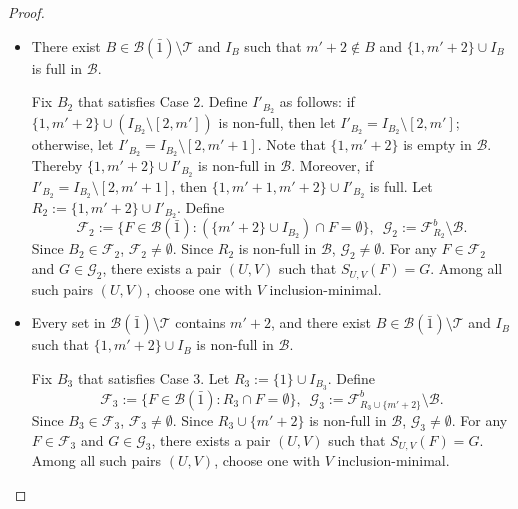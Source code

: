 \documentclass[11pt]{article}
\newcommand{\m}{\mathcal}
\begin{document}
\begin{proof}
\begin{itemize}
Fix $B_1$ that satisfies Case 1. 
Let $R_1:=\{1,m'+2\}\cup I_{B_1}$.
Define 
\begin{equation*}
    \m F_1:=\{F\in \m B(\bar1): R_1\cap F=\emptyset\}, \,\,\,
    \m G_1:=\m F_{R_1}^b\setminus \m B.
\end{equation*}
Since $B_1\in \m F_1$, $\m F_1\ne \emptyset$.
Since $R_1$ is non-full in $\m B$, $\m G_1\ne \emptyset$. 
For any $F\in \m F_1$ and $G\in \m G_1$, there exists a pair $(U,V)$ such that $S_{U,V}(F)=G$. Among all such pairs $(U,V)$, choose one with $V$ inclusion-minimal. 


\item[Case 2.] 
There exist $B\in \m B(\bar{1})\setminus \m T$ and $I_B$ such that $m'+2\not\in B $ and $\{1,m'+2\}\cup I_B$ is full in $\m B$. 

Fix $B_2$ that satisfies Case 2.
Define $I'_{B_2}$ as follows: 
if $\{1,m'+2\}\cup (I_{B_2}\setminus [2,m'])$ is non-full, then 
let $I'_{B_2}=I_{B_2}\setminus [2,m']$; otherwise, let $I'_{B_2}=I_{B_2}\setminus [2,m'+1]$. 
Note that $\{1,m'+2\}$ is empty in $\m B$. Thereby $\{1,m'+2\}\cup I'_{B_2}$ is non-full in $\m B$. Moreover, if $I'_{B_2}=I_{B_2}\setminus [2,m'+1]$, then $\{1,m'+1,m'+2\}\cup I'_{B_2}$ is full. 
Let $R_2:=\{1, m'+2\}\cup I'_{B_2}$.
Define 
\begin{equation*}
    \m F_2:=\{F\in \m B(\bar1): (\{m'+2\}\cup I_{B_2})\cap F=\emptyset\}, \,\,\,
    \m G_2:=\m F_{R_2}^b\setminus \m B.
\end{equation*}
Since $B_2\in \m F_2$, $\m F_2\ne \emptyset$. Since $R_2$ is non-full in $\m B$, $\m G_2\ne \emptyset$. 
For any $F\in \m F_2$ and $G\in \m G_2$, there exists a pair $(U,V)$ such that $S_{U,V}(F)=G$. Among all such pairs $(U,V)$, choose one with $V$ inclusion-minimal. 



\item[Case 3.] Every set in $\m B(\bar{1})\setminus \m T$ contains $m'+2$, and there exist $B\in \m B(\bar{1})\setminus \m T$ and $I_B$ such that $\{1,m'+2\}\cup I_B$ is non-full in $\m B$.

Fix $B_3$ that satisfies Case 3. 
Let $R_3:=\{1\}\cup I_{B_3}$.
Define
\begin{equation*}
    \m F_3:=\{F\in \m B(\bar1): R_3\cap F=\emptyset\}, \,\,\,
    \m G_3:=\m F_{R_3\cup \{m'+2\}}^b\setminus \m B.
\end{equation*}
Since $B_3\in \m F_3$, $\m F_3\ne \emptyset$.
Since $R_3\cup \{m'+2\}$ is non-full in $\m B$, $\m G_3\ne \emptyset$. 
For any $F\in \m F_3$ and $G\in \m G_3$, there exists a pair $(U,V)$ such that $S_{U,V}(F)=G$. Among all such pairs $(U,V)$, choose one with $V$ inclusion-minimal. 


\end{itemize}
\end{proof}
\end{document}
